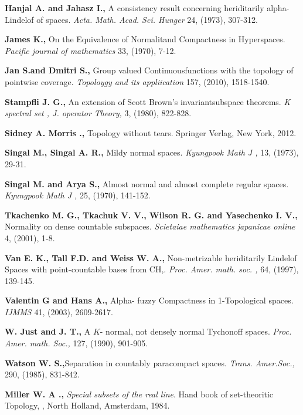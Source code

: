 \documentclass[PhD,14,a4paper]{report}
\theoremstyle{plain}
\theoremstyle{definition}
\theoremstyle{remark}
\numberwithin{figure}{section}
\numberwithin{equation}{subsection}
\begin{document}
{\begin{thebibliography}{12}
\label{Han}
 \textbf{Hanjal A. and Jahasz I.,} A consistency result concerning heriditarily alpha-Lindelof of spaces. \textit{Acta. Math. Acad. Sci. Hunger } 24, (1973), 307-312.

\label{Jam}
 \textbf{James K.,} On the Equivalence of Normalitand Compactness in Hyperspaces. \textit{Pacific journal of mathematics } 33, (1970),  7-12.

\label{Jan}
\textbf{ Jan S.and Dmitri S.,} Group valued Continuousfunctions with the topology of pointwise coverage. \textit{Topoloygy and its appliication} 157, (2010),  1518-1540.

\label{Jos}
\textbf{ Stampfli J. G.,} An extension of Scott Brown's invariantsubspace theorems.\textit{ K spectral set , J. operator Theory, } 3, (1980), 822-828.


\label{Sid}
\textbf{Sidney A. Morris .,} Topology without tears. Springer Verlag, New York, 2012.

\label{Sin}
\textbf{Singal M., Singal A. R.,} Mildy normal spaces. \textit{Kyungpook Math J ,} 13, (1973),  29-31.

\label{Sin}
\textbf{Singal M. and Arya S.,} Almost normal and almost complete regular spaces.\textit{ Kyungpook Math J ,} 25, (1970),  141-152.

\label{Tka}
\textbf{Tkachenko M. G., Tkachuk V. V., Wilson R. G. and Yasechenko I. V.,} Normality on dense countable subspaces. \textit{Scietaiae mathematics japanicae online} 4, (2001),  1-8.

\label{Van}
\textbf{Van  E. K., Tall F.D. and Weiss W. A.,} Non-metrizable heriditarily Lindelof Spaces with point-countable bases from CH,. \textit{Proc. Amer. math. soc. ,} 64, (1997), 139-145.

\label{Val}

\textbf{Valentin G and Hans A.,} Alpha- fuzzy Compactness in 1-Topological spaces.\textit{ IJMMS } 41, (2003), 2609-2617.

\label{Jus}
 \textbf{W. Just and J. T.,} A $K$- normal, not densely normal Tychonoff spaces. \textit{Proc. Amer. math. Soc., } 127, (1990), 901-905.

\label{Wat}
\textbf{ Watson W. S.,}Separation in countably paracompact spaces. \textit{Trans. Amer.Soc.,} 290, (1985), 831-842.

\label{Mil}
\textbf{ Miller W. A .,} \emph{Special subsets of the real line}. Hand book of set-theoritic Topology, , North Holland, Amsterdam, 1984.





\end{thebibliography}}
\end{document}
